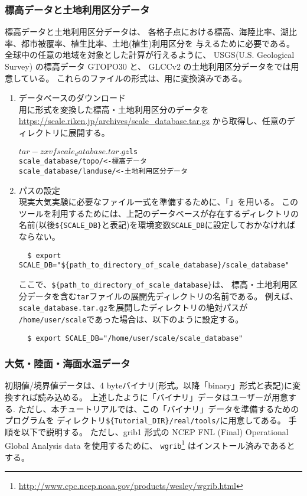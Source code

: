 \subsubsection{標高データと土地利用区分データ}
標高データと土地利用区分データは、
各格子点における標高、海陸比率、湖比率、都市被覆率、植生比率、土地(植生)利用区分を
与えるために必要である。
全球中の任意の地域を対象とした計算が行えるように、
USGS(U.S. Geological Survey) の標高データ GTOPO30 と、
GLCCv2 の土地利用区分データを{\scalerm}では用意している。
これらのファイルの形式は、{\scalerm}用に変換済みである。

\begin{enumerate}
\item データベースのダウンロード\\
\scalerm 用に形式を変換した標高・土地利用区分のデータを
 \url{https://scale.riken.jp/archives/scale_database.tar.gz}
から取得し、任意のディレクトリに展開する。
\begin{alltt}
  $ tar -zxvf scale_database.tar.gz
  $ ls
    scale_database/topo/    <- 標高データ
    scale_database/landuse/ <- 土地利用区分データ
\end{alltt}

\item パスの設定\\
現実大気実験に必要なファイル一式を準備するために、「{\makeconftool}」を用いる。
このツールを利用するためには、上記のデータベースが存在するディレクトリの名前(以後\verb|${SCALE_DB}|と表記)を環境変数\verb|SCALE_DB|に設定しておかなければならない。
\begin{verbatim}
  $ export SCALE_DB="${path_to_directory_of_scale_database}/scale_database"
\end{verbatim}
ここで、\verb|${path_to_directory_of_scale_database}|は、
標高・土地利用区分データを含む\verb|tar|ファイルの展開先ディレクトリの名前である。
例えば、\verb|scale_database.tar.gz|を展開したディレクトリの絶対パスが
\verb|/home/user/scale|であった場合は、以下のように設定する。
\begin{verbatim}
  $ export SCALE_DB="/home/user/scale/scale_database"
\end{verbatim}
\end{enumerate}

\subsubsection{大気・陸面・海面水温データ}
初期値/境界値データは、4 byteバイナリ(\grads 形式。以降「binary」形式と表記)に変換すれば読み込める。
上述したように「バイナリ」データはユーザーが用意する.
ただし、本チュートリアルでは、この「バイナリ」データを準備するためのプログラムを
ディレクトリ\verb|${Tutorial_DIR}/real/tools/|に用意してある。
手順を以下で説明する。
ただし、grib1 形式の NCEP FNL (Final) Operational Global Analysis data を使用するために、
\verb|wgrib|\footnote{
\url{http://www.cpc.ncep.noaa.gov/products/wesley/wgrib.html}
}
はインストール済みであるとする。

